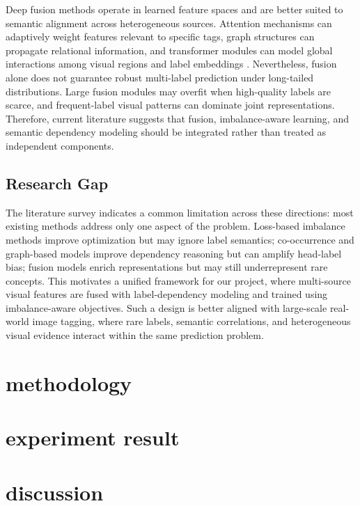 \documentclass[10pt,journal,compsoc]{IEEEtran}
\begin{document}
Deep fusion methods operate in learned feature spaces and are better suited to semantic alignment across heterogeneous sources. Attention mechanisms can adaptively weight features relevant to specific tags, graph structures can propagate relational information, and transformer modules can model global interactions among visual regions and label embeddings \cite{guo2019deep,zhao2024deep}. Nevertheless, fusion alone does not guarantee robust multi-label prediction under long-tailed distributions. Large fusion modules may overfit when high-quality labels are scarce, and frequent-label visual patterns can dominate joint representations. Therefore, current literature suggests that fusion, imbalance-aware learning, and semantic dependency modeling should be integrated rather than treated as independent components.

\subsection{Research Gap}

The literature survey indicates a common limitation across these directions: most existing methods address only one aspect of the problem. Loss-based imbalance methods improve optimization but may ignore label semantics; co-occurrence and graph-based models improve dependency reasoning but can amplify head-label bias; fusion models enrich representations but may still underrepresent rare concepts. This motivates a unified framework for our project, where multi-source visual features are fused with label-dependency modeling and trained using imbalance-aware objectives. Such a design is better aligned with large-scale real-world image tagging, where rare labels, semantic correlations, and heterogeneous visual evidence interact within the same prediction problem.


\section{methodology}


\section{experiment result}


\section{discussion}
\end{document}
